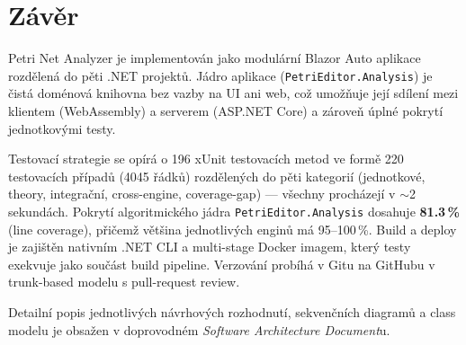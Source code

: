 \documentclass[12pt,a4paper]{article}
\begin{document}
\section{Závěr}

Petri Net Analyzer je implementován jako modulární Blazor Auto aplikace
rozdělená do pěti .NET projektů. Jádro aplikace (\texttt{PetriEditor.Analysis})
je čistá doménová knihovna bez vazby na UI ani web, což umožňuje její
sdílení mezi klientem (WebAssembly) a serverem (ASP.NET Core)
a zároveň úplné pokrytí jednotkovými testy.

Testovací strategie se opírá o 196 xUnit testovacích metod ve formě
220 testovacích případů (4045 řádků) rozdělených do pěti kategorií
(jednotkové, theory, integrační, cross-engine, coverage-gap) —
všechny procházejí v $\sim$2 sekundách. Pokrytí algoritmického jádra
\texttt{PetriEditor.Analysis} dosahuje \textbf{81.3\,\%} (line coverage),
přičemž většina jednotlivých enginů má 95--100\,\%. Build a deploy
je zajištěn nativním .NET CLI a multi-stage Docker imagem, který testy
exekvuje jako součást build pipeline. Verzování probíhá v Gitu na GitHubu
v trunk-based modelu s pull-request review.

Detailní popis jednotlivých návrhových rozhodnutí, sekvenčních diagramů
a class modelu je obsažen v doprovodném \emph{Software Architecture Document}u.
\end{document}
